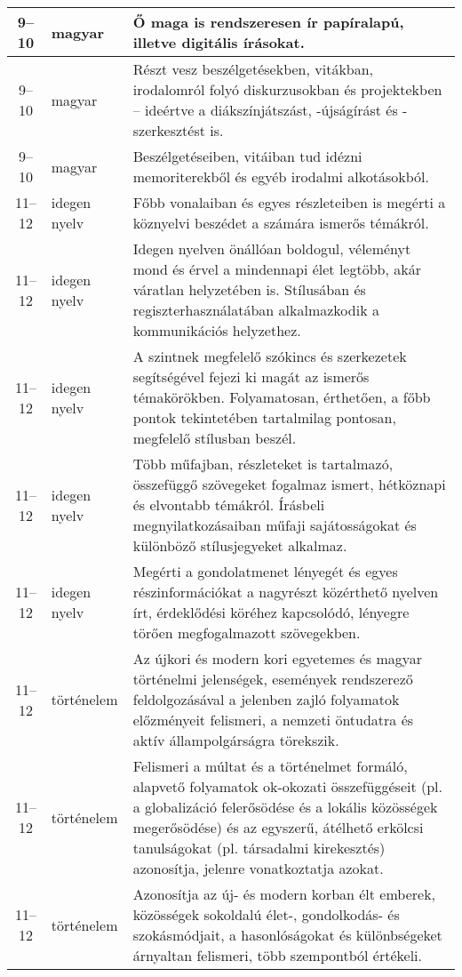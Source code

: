 \begin{small}
\begin{longtable}{c | p{2cm} |  p{11cm} }
              9--10 & magyar & Ő maga is rendszeresen ír papíralapú, illetve digitális írásokat. \\ \hline
              9--10 & magyar & Részt vesz beszélgetésekben, vitákban, irodalomról folyó diskurzusokban és projektekben – ideértve a diákszínjátszást, -újságírást és -szerkesztést is. \\ \hline
              9--10 & magyar & Beszélgetéseiben, vitáiban tud idézni memoriterekből és egyéb irodalmi alkotásokból. \\ \hline
              11--12 & idegen nyelv & Főbb vonalaiban és egyes részleteiben is megérti a köznyelvi beszédet a számára ismerős témákról. \\ \hline
              11--12 & idegen nyelv & Idegen nyelven önállóan boldogul, véleményt mond és érvel a mindennapi élet legtöbb, akár váratlan helyzetében is. Stílusában és regiszterhasználatában alkalmazkodik a kommunikációs helyzethez. \\ \hline
              11--12 & idegen nyelv & A szintnek megfelelő szókincs és szerkezetek segítségével fejezi ki magát az ismerős témakörökben. Folyamatosan, érthetően, a főbb pontok tekintetében tartalmilag pontosan, megfelelő stílusban beszél. \\ \hline
              11--12 & idegen nyelv & Több műfajban, részleteket is tartalmazó, összefüggő szövegeket fogalmaz ismert, hétköznapi és elvontabb témákról. Írásbeli megnyilatkozásaiban műfaji sajátosságokat és különböző stílusjegyeket alkalmaz. \\ \hline
              11--12 & idegen nyelv & Megérti a gondolatmenet lényegét és egyes részinformációkat a nagyrészt közérthető nyelven írt, érdeklődési köréhez kapcsolódó, lényegre törően megfogalmazott szövegekben. \\ \hline
              11--12 & történelem & Az újkori és modern kori egyetemes és magyar történelmi jelenségek, események rendszerező feldolgozásával a jelenben zajló folyamatok előzményeit felismeri, a nemzeti öntudatra és aktív állampolgárságra törekszik. \\ \hline
              11--12 & történelem & Felismeri a múltat és a történelmet formáló, alapvető folyamatok ok-okozati összefüggéseit (pl. a globalizáció felerősödése és a lokális közösségek megerősödése) és az egyszerű, átélhető erkölcsi tanulságokat (pl. társadalmi kirekesztés) azonosítja, jelenre vonatkoztatja azokat. \\ \hline
              11--12 & történelem & Azonosítja az új- és modern korban élt emberek, közösségek sokoldalú élet-, gondolkodás- és szokásmódjait, a hasonlóságokat és különbségeket árnyaltan felismeri, több szempontból értékeli. \\ \hline

\end{longtable}
\end{small}
